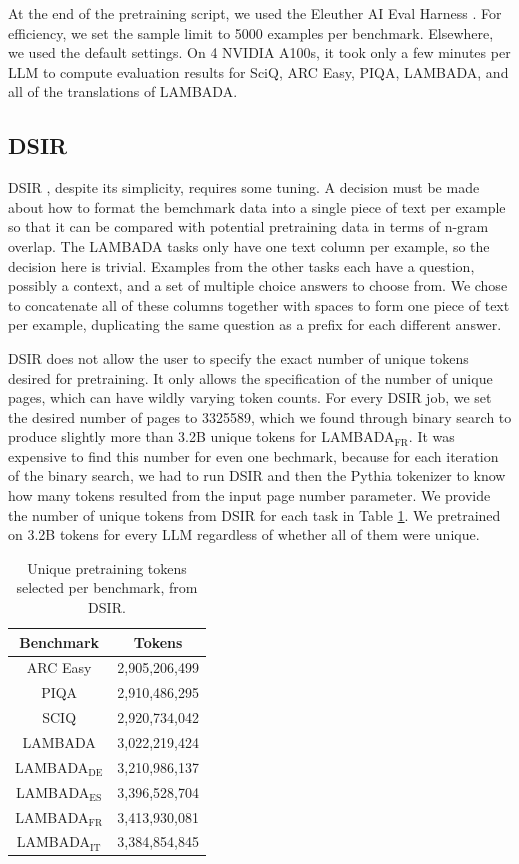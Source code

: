\documentclass{article} %
\begin{document}
At the end of the pretraining script, we used the Eleuther AI Eval Harness \citep{eval-harness}. For efficiency, we set the sample limit to 5000 examples per benchmark. Elsewhere, we used the default settings. On 4 NVIDIA A100s, it took only a few minutes per LLM to compute evaluation results for SciQ, ARC Easy, PIQA, LAMBADA, and all of the translations of LAMBADA.

\subsection{DSIR}

DSIR \citep{dsir}, despite its simplicity, requires some tuning. A decision must be made about how to format the bemchmark data into a single piece of text per example so that it can be compared with potential pretraining data in terms of n-gram overlap. The LAMBADA tasks only have one text column per example, so the decision here is trivial. Examples from the other tasks each have a question, possibly a context, and a set of multiple choice answers to choose from. We chose to concatenate all of these columns together with spaces to form one piece of text per example, duplicating the same question as a prefix for each different answer.

DSIR does not allow the user to specify the exact number of unique tokens desired for pretraining. It only allows the specification of the number of unique pages, which can have wildly varying token counts. For every DSIR job, we set the desired number of pages to 3325589, which we found through binary search to produce slightly more than 3.2B unique tokens for LAMBADA$_{\text{FR}}$. It was expensive to find this number for even one bechmark, because for each iteration of the binary search, we had to run DSIR and then the Pythia tokenizer to know how many tokens resulted from the input page number parameter. We provide the number of unique tokens from DSIR for each task in Table \ref{dsir_tokens}. We pretrained on 3.2B tokens for every LLM regardless of whether all of them were unique.

\begin{table}[t]
\centering
\caption{Unique pretraining tokens selected per benchmark, from DSIR.}
\begin{tabular}{|c|c|}
\hline
\textbf{Benchmark} & \textbf{Tokens} \\
\hline
ARC Easy & 2,905,206,499 \\
\hline
PIQA & 2,910,486,295 \\
\hline
SCIQ & 2,920,734,042 \\
\hline
LAMBADA & 3,022,219,424 \\
\hline
LAMBADA$_{\text{DE}}$ & 3,210,986,137 \\
\hline
LAMBADA$_{\text{ES}}$ & 3,396,528,704 \\
\hline
LAMBADA$_{\text{FR}}$ & 3,413,930,081 \\
\hline
LAMBADA$_{\text{IT}}$ & 3,384,854,845 \\
\hline
\end{tabular}
\label{dsir_tokens}
\end{table}
\end{document}
